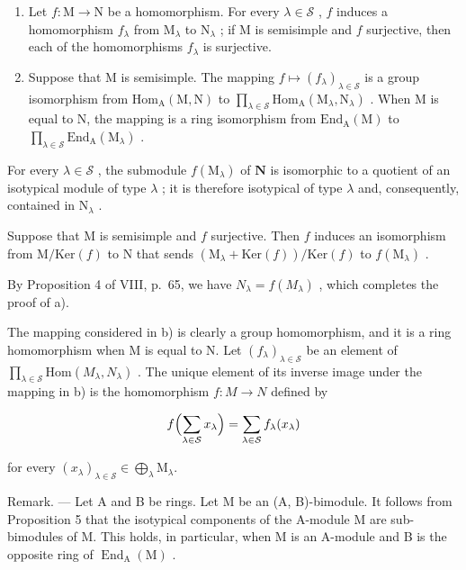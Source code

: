 \begin{enumerate}
\def\labelenumi{\alph{enumi})}
\item
  Let \(f: \mathrm{M} \to \mathrm{N}\) be a homomorphism. For every \(\lambda \in \mathcal{S}\) , \(f\) induces a homomorphism \(f_{\lambda}\) from \(\mathrm{M}_{\lambda}\) to \(\mathrm{N}_{\lambda}\) ; if \(\mathrm{M}\) is semisimple and \(f\) surjective, then each of the homomorphisms \(f_{\lambda}\) is surjective.
\item
  Suppose that M is semisimple. The mapping \(f \mapsto (f_{\lambda})_{\lambda \in \mathcal{S}}\) is a group isomorphism from \(\mathrm{Hom}_{\mathrm{A}}(\mathrm{M},\mathrm{N})\) to \(\prod_{\lambda \in \mathcal{S}}\mathrm{Hom}_{\mathrm{A}}(\mathrm{M}_{\lambda},\mathrm{N}_{\lambda})\) . When M is equal to N, the mapping is a ring isomorphism from \(\mathrm{End}_{\mathrm{A}}(\mathrm{M})\) to \(\prod_{\lambda \in \mathcal{S}}\mathrm{End}_{\mathrm{A}}(\mathrm{M}_{\lambda})\) .
\end{enumerate}

For every \(\lambda \in \mathcal{S}\) , the submodule \(f(\mathrm{M}_{\lambda})\) of \(\mathbf{N}\) is isomorphic to a quotient of an isotypical module of type \(\lambda\) ; it is therefore isotypical of type \(\lambda\) and, consequently, contained in \(\mathrm{N}_{\lambda}\) .

Suppose that \(\mathrm{M}\) is semisimple and \(f\) surjective. Then \(f\) induces an isomorphism from \(\mathrm{M} / \mathrm{Ker}(f)\) to \(\mathrm{N}\) that sends \((\mathrm{M}_{\lambda} + \mathrm{Ker}(f)) / \mathrm{Ker}(f)\) to \(f(\mathrm{M}_{\lambda})\) .

By Proposition 4 of VIII, p.~65, we have \(N_{\lambda} = f(M_{\lambda})\) , which completes the proof of a).

The mapping considered in b) is clearly a group homomorphism, and it is a ring homomorphism when M is equal to N. Let \((f_{\lambda})_{\lambda \in \mathcal{S}}\) be an element of \(\prod_{\lambda \in \mathcal{S}} \mathrm{Hom}(M_{\lambda}, N_{\lambda})\) . The unique element of its inverse image under the mapping in b) is the homomorphism \(f : M \to N\) defined by

\[
f \Bigl (\sum_ {\lambda \in \mathcal {S}} x _ {\lambda} \Bigr) = \sum_ {\lambda \in \mathcal {S}} f _ {\lambda} (x _ {\lambda})
\]

for every \((x_{\lambda})_{\lambda \in \mathcal{S}}\in \bigoplus_{\lambda}\mathrm{M}_{\lambda}\).

Remark. --- Let A and B be rings. Let M be an (A, B)-bimodule. It follows from Proposition 5 that the isotypical components of the A-module M are sub-bimodules of M. This holds, in particular, when M is an A-module and B is the opposite ring of \(\operatorname{End}_{\mathrm{A}}(\mathrm{M})\) .

